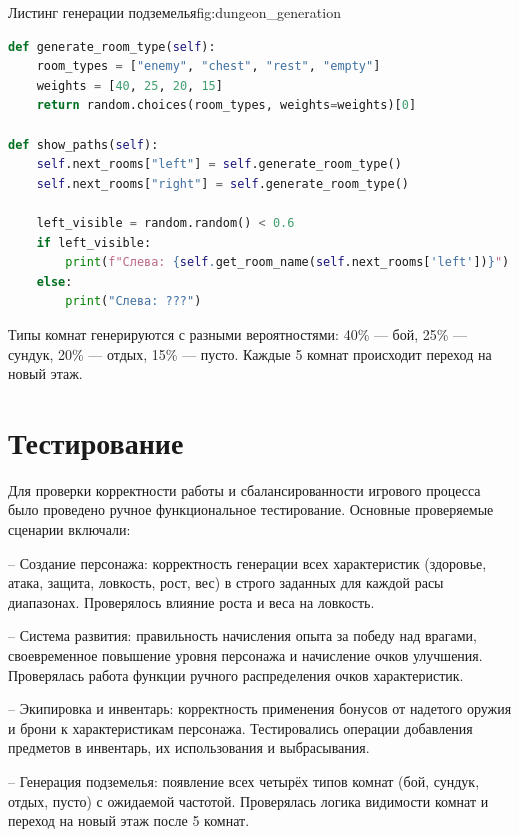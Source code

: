 \documentclass[]{vvsu}
\begin{document}
\begin{vvsu_figure}{Листинг генерации подземелья}{fig:dungeon_generation}
  \begin{minipage}{.95\textwidth}
    \begin{lstlisting}[language=Python]
def generate_room_type(self):
    room_types = ["enemy", "chest", "rest", "empty"]
    weights = [40, 25, 20, 15]
    return random.choices(room_types, weights=weights)[0]

def show_paths(self):
    self.next_rooms["left"] = self.generate_room_type()
    self.next_rooms["right"] = self.generate_room_type()
    
    left_visible = random.random() < 0.6
    if left_visible:
        print(f"Слева: {self.get_room_name(self.next_rooms['left'])}")
    else:
        print("Слева: ???")
    \end{lstlisting}
  \end{minipage}
\end{vvsu_figure}

Типы комнат генерируются с разными вероятностями: 40\% — бой, 25\% — сундук, 20\% — отдых, 15\% — пусто. Каждые 5 комнат происходит переход на новый этаж.

\section{Тестирование}

Для проверки корректности работы и сбалансированности игрового процесса было проведено ручное функциональное тестирование. Основные проверяемые сценарии включали:

– Создание персонажа: корректность генерации всех характеристик (здоровье, атака, защита, ловкость, рост, вес) в строго заданных для каждой расы диапазонах. Проверялось влияние роста и веса на ловкость.

– Система развития: правильность начисления опыта за победу над врагами, своевременное повышение уровня персонажа и начисление очков улучшения. Проверялась работа функции ручного распределения очков характеристик.

– Экипировка и инвентарь: корректность применения бонусов от надетого оружия и брони к характеристикам персонажа. Тестировались операции добавления предметов в инвентарь, их использования и выбрасывания.

– Генерация подземелья: появление всех четырёх типов комнат (бой, сундук, отдых, пусто) с ожидаемой частотой. Проверялась логика видимости комнат и переход на новый этаж после 5 комнат.
\end{document}
